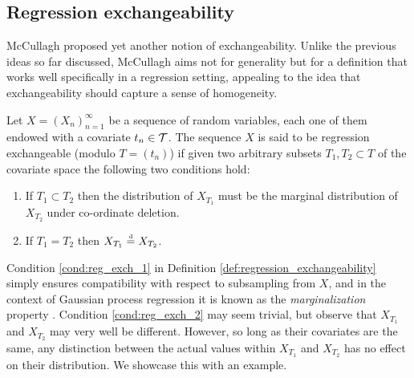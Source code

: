 \subsection{Regression exchangeability}



McCullagh \cite{McCullagh:2005:ExchAndReg} proposed yet another notion of exchangeability. Unlike the previous ideas so far discussed, McCullagh aims not for generality but for a definition that works well specifically in a regression setting, appealing to the idea that exchangeability should capture a sense of homogeneity.

\begin{definition}	\label{def:regression_exchangeability}
	Let $X = (X_n)_{n=1}^{\infty}$ be a sequence of random variables, each one of them endowed with a covariate $t_n \in \mathcal{T}$. The sequence $X$ is said to be regression exchangeable (modulo $T = (t_n)$) if given two arbitrary subsets $T_1, T_2 \subset T$ of the covariate space the following two conditions hold:
	\begin{enumerate}
		\item If $T_1 \subset T_2$ then the distribution of $X_{T_1}$ must be the marginal distribution of $X_{T_2}$ under co-ordinate deletion. \label{cond:reg_exch_1}
		\item If $T_1 = T_2$ then $X_{T_1} \stackrel{\text{\rm\tiny d}}{=} X_{T_2}$. \label{cond:reg_exch_2}
	\end{enumerate}
\end{definition}


Condition \ref{cond:reg_exch_1} in Definition \ref{def:regression_exchangeability} simply ensures compatibility with respect to subsampling from $X$, and in the context of Gaussian process regression it is known as the \textit{marginalization} property \cite[][p.~13]{RasmussenWilliams:2006}. Condition \ref{cond:reg_exch_2} may seem trivial, but observe that $X_{T_1}$ and $X_{T_2}$ may very well be different. However, so long as their covariates are the same, any distinction between the actual values within $X_{T_1}$ and $X_{T_2}$ has no effect on their distribution. We showcase this with an example.



